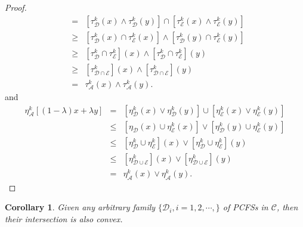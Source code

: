 \documentclass[12pt,letterpaper]{amsart}
\theoremstyle{plain}
\newtheorem{corollary}{Corollary}[section]
\theoremstyle{definition}
\numberwithin{equation}{section}
\begin{document}
\begin{proof}
\begin{eqnarray*}
& = & [\tau^k_{\mathcal{D}} (x) \wedge \tau^k_{\mathcal{D}} (y)] \cap [\tau^k_{\mathcal{E}} (x) \wedge \tau^k_{\mathcal{E}} (y)]\\
&\geq & [\tau^k_{\mathcal{D}}(x) \cap \tau^k_{\mathcal{E}}(x)] \wedge [\tau^k_{\mathcal{D}}(y) \cap \tau^k_{\mathcal{E}}(y)]\\
&\geq &[\tau^k_{\mathcal{D}} \cap \tau^k_{\mathcal{E}}](x) \wedge [\tau^k_{\mathcal{D}} \cap \tau^k_{\mathcal{E}}](y)\\ & \geq & [\tau^k_{\mathcal{D} \cap \mathcal{E}}](x) \wedge [\tau^k_{\mathcal{D}  \cap \mathcal{E}}](y)\\ & = & \tau^k_{\mathcal{A}} (x) \wedge \tau^k_{\mathcal{A}} (y).
\end{eqnarray*}
and 
\begin{eqnarray*} \eta^k_{\mathcal{A}} [(1 - \lambda)x + \lambda y]  
& = & [\eta^k_{\mathcal{D}} (x) \vee \eta^k_{\mathcal{D} } (y)] \cup [\eta^k_{\mathcal{E}} (x) \vee \eta^k_{\mathcal{E}} (y)]\\
&\leq & [\eta_{\mathcal{D}}(x) \cup \eta^k_{\mathcal{E} }(x)] \vee [\eta^k_{\mathcal{D}}(y) \cup \eta^k_{\mathcal{E}}(y)]\\
&\leq &[\eta^k_{\mathcal{D}} \cup \eta^k_{\mathcal{E}}](x) \vee [\eta^k_{\mathcal{D}} \cup \eta^k_{\mathcal{E}}](y)\\ & \leq & [\eta^k_{\mathcal{D} \cup \mathcal{E}}](x) \vee [\eta^k_{\mathcal{D}  \cup \mathcal{E}}](y)\\ & = & \eta^k_{\mathcal{A}} (x) \vee \eta^k_{\mathcal{A}} (y).
\end{eqnarray*}
\end{proof}

\begin{corollary} \label{j} 
Given any arbitrary family $\{ \mathcal{D}_i, i = 1, 2, \cdots, \}$ of PCFSs in $\mathcal{C}$, then their intersection is also convex.
\end{corollary}
\end{document}
